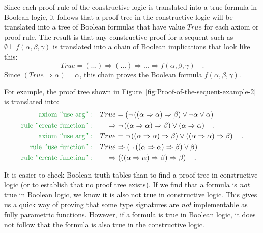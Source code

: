 Since each proof rule of the constructive logic is translated into
a true formula in Boolean logic, it follows that a proof tree in the
constructive logic will be translated into a tree of Boolean formulas
that have value $True$ for each axiom or proof rule. The result is
that any constructive proof for a sequent such as $\emptyset\vdash f(\alpha,\beta,\gamma)$
is translated into a chain of Boolean implications that look like
this:
\[
True=(...)\Rightarrow(...)\Rightarrow...\Rightarrow f(\alpha,\beta,\gamma)\quad.
\]
Since $\left(True\Rightarrow\alpha\right)=\alpha$, this chain proves
the Boolean formula $f(\alpha,\beta,\gamma)$.

For example, the proof tree shown in Figure~\ref{fig:Proof-of-the-sequent-example-2}
is translated into:
\begin{align*}
{\color{greenunder}\text{axiom \textsf{``}use arg\textsf{''}}:}\quad & True=\left(\neg\left(\left(\alpha\Rightarrow\alpha\right)\Rightarrow\beta\right)\vee\neg\alpha\vee\alpha\right)\\
{\color{greenunder}\text{rule \textsf{``}create function\textsf{''}}:}\quad & \quad\Rightarrow\neg\left(\left(\alpha\Rightarrow\alpha\right)\Rightarrow\beta\right)\vee\left(\alpha\Rightarrow\alpha\right)\quad.\\
{\color{greenunder}\text{axiom \textsf{``}use arg\textsf{''}}:}\quad & True=\neg\left(\left(\alpha\Rightarrow\alpha\right)\Rightarrow\beta\right)\vee\left(\left(\alpha\Rightarrow\alpha\right)\Rightarrow\beta\right)\quad.\\
{\color{greenunder}\text{rule \textsf{``}use function\textsf{''}}:}\quad & True\Rightarrow\left(\neg\left(\left(\alpha\Rightarrow\alpha\right)\Rightarrow\beta\right)\vee\beta\right)\\
{\color{greenunder}\text{rule \textsf{``}create function\textsf{''}}:}\quad & \quad\Rightarrow\left(\left(\left(\alpha\Rightarrow\alpha\right)\Rightarrow\beta\right)\Rightarrow\beta\right)\quad.
\end{align*}

It is easier to check Boolean truth tables than to find a proof tree
in constructive logic (or to establish that no proof tree exists).
If we find that a formula is \emph{not} true in Boolean logic, we
know it is also not true in constructive logic. This gives us a quick
way of proving that some type signatures are \emph{not} implementable
as fully parametric functions. However, if a formula is true in Boolean
logic, it does not follow that the formula is also true in the constructive
logic.

